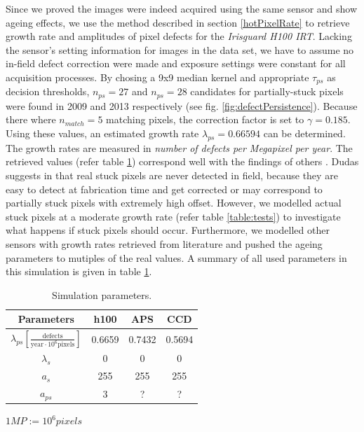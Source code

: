 \documentclass[10pt,twocolumn,letterpaper]{article}
\begin{document}
\vspace{-4mm}

Since we proved the images were indeed acquired using the same sensor and show ageing effects, we use the method described in section \ref{hotPixelRate} to retrieve growth rate and amplitudes of pixel defects for the \emph{Irisguard H100 IRT}. Lacking the sensor's setting information for images in the data set, we have to assume no in-field defect correction \cite{inFieldDefects} were made and exposure settings were constant for all acquisition processes. By chosing a 9x9 median kernel and appropriate $\tau_{ps}$ as decision thresholds, $n_{ps}=27$ and $n_{ps}=28$ candidates for partially-stuck pixels were found in 2009 and 2013 respectively (see fig. \ref{fig:defectPersistence}). Because there where $n_{match}=5$ matching pixels, the correction factor is set to $\gamma=0.185$. Using these values, an estimated growth rate $\lambda_{ps}=0.66594$ can be determined. The growth rates are measured in \emph{number of defects per Megapixel per year}. The retrieved values (refer table \ref{table:parameters}) correspond well with the findings of others \cite{defectDetection, leung}. Dudas suggests in \cite{inFieldDefects} that real stuck pixels are never detected in field, because they are easy to detect at fabrication time and get corrected or may correspond to partially stuck pixels with extremely high offset. However, we modelled actual stuck pixels at a moderate growth rate (refer table \ref{table:tests}) to investigate what happens if stuck pixels should occur. Furthermore, we modelled other sensors with growth rates retrieved from literature and pushed the ageing parameters to mutiples of the real values. A summary of all used parameters in this simulation is given in table \ref{table:parameters}.


 \bgroup
\def\arraystretch{1.3}%
 \begin{table} [hbt]
  \begin{center}
    \begin{tabular}{|c | c c c|}
    \hline 
    \textbf{Parameters} & h100  & APS \cite{leung} & CCD \cite{leung} \\
    \hline 
    $\lambda_{ps} [\frac{\text{defects}}{\text{year} \cdot 10^6 \text{pixels}}]$  & 0.6659 &  0.7432 & 0.5694 \\
    $\lambda_s$ 	&  0  & 0 & 0 \\
    $a_s$		&  255  & 255 & 255 \\
    $a_{ps}$	&  3  & ? & ? \\
    \hline  
    \end{tabular}

    \vspace{1mm}
    \hfill \tiny { $1MP := 10^6 pixels$}
     \vspace{-2mm}
    
    \caption{Simulation parameters. }
    \label{table:parameters}
  \end{center}
  \vspace{-5mm}
\end{table}
\end{document}
